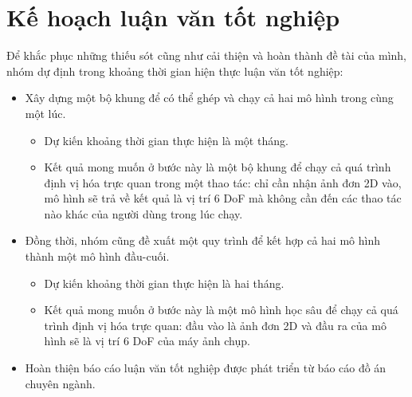 \section{Kế hoạch luận văn tốt nghiệp}
Để khắc phục những thiếu sót cũng như cải thiện và hoàn thành đề tài của mình, nhóm dự định trong khoảng thời gian hiện thực luận văn tốt nghiệp:
\begin{itemize}
	\item Xây dựng một bộ khung để có thể ghép và chạy cả hai mô hình trong cùng một lúc.
		\begin{itemize}
			\item Dự kiến khoảng thời gian thực hiện là một tháng.
			\item Kết quả mong muốn ở bước này là một bộ khung để chạy cả quá trình định vị hóa trực quan trong một thao tác: chỉ cần nhận ảnh đơn 2D vào, mô hình sẽ trả về kết quả là vị trí 6 DoF mà không cần đến các thao tác nào khác của người dùng trong lúc chạy.
		\end{itemize}
	\item Đồng thời, nhóm cũng đề xuất một quy trình để kết hợp cả hai mô hình thành một mô hình đầu-cuối.
		\begin{itemize}
			\item Dự kiến khoảng thời gian thực hiện là hai tháng.
			\item Kết quả mong muốn ở bước này là một mô hình học sâu để chạy cả quá trình định vị hóa trực quan: đầu vào là ảnh đơn 2D và đầu ra của mô hình sẽ là vị trí 6 DoF của máy ảnh chụp.
		\end{itemize}
	\item Hoàn thiện báo cáo luận văn tốt nghiệp được phát triển từ báo cáo đồ án chuyên ngành.
\end{itemize}
